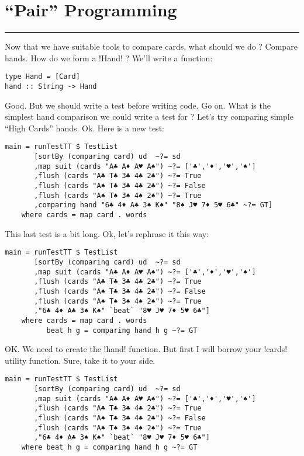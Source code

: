 \newpage
\section{``Pair'' Programming} 
\vspace{10cm}
\hrule

\lhQ Now that we have suitable tools to compare cards, what should we do ?
\lhA Compare hands.
\lhN How do we form a \il!Hand! ?
\lhA We'll write a function:
\begin{lstlisting}[frame=single]
type Hand = [Card]
hand :: String -> Hand
\end{lstlisting}
\lhN Good. But we should write a test before writing code.
\lhA Go on.
\lhN What is the simplest hand comparison we could write a test for ?
\lhA Let's try comparing simple ``High Cards'' hands.
\lhN Ok. Here is a new test:
\begin{lstlisting}[frame=single,escapechar=!]
main = runTestTT $ TestList 
       [sortBy (comparing card) ud  ~?= sd
       ,map suit (cards "A♣ A♦ A♥ A♠") ~?= ['♣','♦','♥','♠']
       ,flush (cards "A♣ T♣ 3♣ 4♣ 2♣") ~?= True
       ,flush (cards "A♠ T♣ 3♣ 4♣ 2♣") ~?= False
       ,flush (cards "A♠ T♠ 3♠ 4♠ 2♠") ~?= True
       ,comparing hand "6♣ 4♦ A♣ 3♠ K♠" "8♠ J♥ 7♦ 5♥ 6♣" ~?= GT]
    where cards = map card . words 
\end{lstlisting} %
\hspace*{\fill}
\lhA This last test is a bit long.
\lhN Ok, let's rephrase it this way:
\begin{lstlisting}[frame=single]
main = runTestTT $ TestList 
       [sortBy (comparing card) ud  ~?= sd
       ,map suit (cards "A♣ A♦ A♥ A♠") ~?= ['♣','♦','♥','♠']
       ,flush (cards "A♣ T♣ 3♣ 4♣ 2♣") ~?= True
       ,flush (cards "A♠ T♣ 3♣ 4♣ 2♣") ~?= False
       ,flush (cards "A♠ T♠ 3♠ 4♠ 2♠") ~?= True
       ,"6♣ 4♦ A♣ 3♠ K♠" `beat` "8♥ J♥ 7♦ 5♥ 6♣"]
    where cards = map card . words 
          beat h g = comparing hand h g ~?= GT
\end{lstlisting} %
\hspace*{\fill}
\lhA \error OK. We need to create the \il!hand! function. But first I will borrow your \il!cards! utility function.
\lhN Sure, take it to your side.
\begin{lstlisting}[frame=single]
main = runTestTT $ TestList 
       [sortBy (comparing card) ud  ~?= sd
       ,map suit (cards "A♣ A♦ A♥ A♠") ~?= ['♣','♦','♥','♠']
       ,flush (cards "A♣ T♣ 3♣ 4♣ 2♣") ~?= True
       ,flush (cards "A♠ T♣ 3♣ 4♣ 2♣") ~?= False
       ,flush (cards "A♠ T♠ 3♠ 4♠ 2♠") ~?= True
       ,"6♣ 4♦ A♣ 3♠ K♠" `beat` "8♥ J♥ 7♦ 5♥ 6♣"]
    where beat h g = comparing hand h g ~?= GT
\end{lstlisting} %
